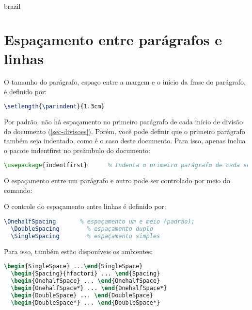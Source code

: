 \begin{otherlanguage*}{brazil}
\section{Espaçamento entre parágrafos e linhas}

O tamanho do parágrafo, espaço entre a margem
e o início da frase do parágrafo, é definido por:

\begin{lstlisting}[language=tex]
   \setlength{\parindent}{1.3cm}
\end{lstlisting}

Por padrão, não há espaçamento no
primeiro parágrafo de cada início de divisão do documento
(\autoref{sec-divisoes}). Porém, você pode definir que o primeiro parágrafo
também seja indentado, como é o caso deste documento. Para isso, apenas inclua o
pacote \textsf{indentfirst} no preâmbulo do documento:

\begin{lstlisting}[language=tex]
   \usepackage{indentfirst}      % Indenta o primeiro parágrafo de cada seção.
\end{lstlisting}

O espaçamento entre um parágrafo e outro
pode ser controlado por meio do comando:

\begin{verbnobox}[\small]
  \setlength{\parskip}{0.2cm}  %
\end{verbnobox}

O controle do espaçamento entre linhas é
definido por:

\begin{lstlisting}[language=tex]
  \OnehalfSpacing       % espaçamento um e meio (padrão);
  \DoubleSpacing        % espaçamento duplo
  \SingleSpacing        % espaçamento simples
\end{lstlisting}

Para isso, também estão disponíveis os ambientes:

\begin{lstlisting}[language=tex]
  \begin{SingleSpace} ...\end{SingleSpace}
  \begin{Spacing}{hfactori} ... \end{Spacing}
  \begin{OnehalfSpace} ... \end{OnehalfSpace}
  \begin{OnehalfSpace*} ... \end{OnehalfSpace*}
  \begin{DoubleSpace} ... \end{DoubleSpace}
  \begin{DoubleSpace*} ... \end{DoubleSpace*}
\end{lstlisting}


\end{otherlanguage*}
